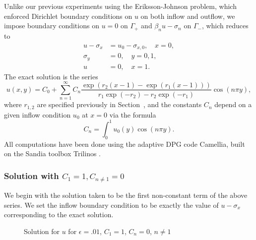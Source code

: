 Unlike our previous experiments using the Eriksson-Johnson problem, which enforced Dirichlet boundary conditions on $u$ on both inflow and outflow, we impose boundary conditions on $u=0$ on $\Gamma_+$ and $\beta_n u - \sigma_n$ on $\Gamma_-$, which reduces to
\begin{align*}
u-\sigma_x &= u_0-\sigma_{x,0}, \quad x=0,\\
\sigma_y &=  0, \quad y=0,1,\\
u &= 0, \quad x=1.
\end{align*}
The exact solution is the series
\[
u(x,y) = C_0 + \sum_{n=1}^\infty C_n \frac{\exp(r_2(x-1)-\exp(r_1(x-1)))}{r_1\exp(-r_2) - r_2\exp(-r_1)}\cos(n\pi y),
\]
where $r_{1,2}$ are specified previously in Section~, and the constants $C_n$ depend on a given inflow condition $u_0$ at $x=0$ via the formula
\[
C_n = \int_0^1 u_0(y) \cos(n\pi y).
\]
All computations have been done using the adaptive DPG code Camellia, built on the Sandia toolbox Trilinos \cite{Camellia}.

\subsubsection{Solution with $C_1 = 1, C_{n\neq 1} = 0$}

We begin with the solution taken to be the first non-constant term of the above series.  We set the inflow boundary condition to be exactly the value of $u-\sigma_x$ corresponding to the exact solution.  

\begin{figure}[h!]
\centering
{}
\caption{Solution for $u$ for $\epsilon = .01$, $C_1 = 1$, $C_n=0$, $n\neq 1$}
\end{figure}


